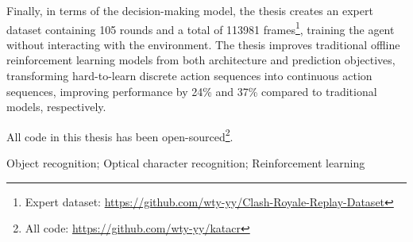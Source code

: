 \noindent Finally, in terms of the decision-making model, the thesis creates an expert dataset containing 105 rounds and a total of 113981 frames\footnote{Expert dataset: \url{https://github.com/wty-yy/Clash-Royale-Replay-Dataset}\hfill}, training the agent without interacting with the environment. The thesis improves traditional offline reinforcement learning models from both architecture and prediction objectives, transforming hard-to-learn discrete action sequences into continuous action sequences, improving performance by 24\% and 37\% compared to traditional models, respectively.

\noindent All code in this thesis has been open-sourced\footnote{All code: \url{https://github.com/wty-yy/katacr}}.

\vspace{\baselineskip}
 Object recognition; Optical character recognition; Reinforcement learning


\titlespacing{\chapter}{0pt}{-6mm}{5mm}
\clearpage{\pagestyle{empty}\cleardoublepage}
